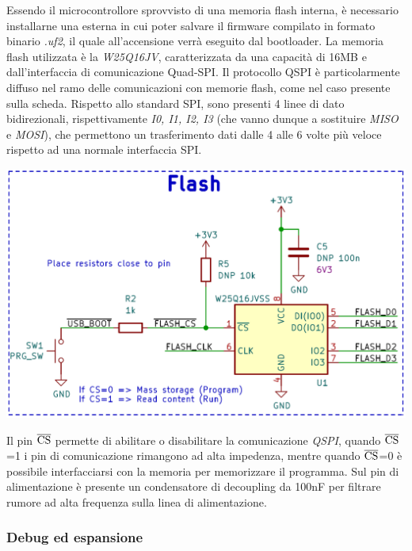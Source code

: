 Essendo il microcontrollore sprovvisto di una memoria flash interna, 
è necessario installarne una esterna in cui poter salvare il firmware compilato in formato
binario \emph{.uf2}, il quale all'accensione verrà eseguito dal bootloader. La
memoria flash utilizzata è la \emph{W25Q16JV}, caratterizzata da una capacità di 16MB e dall’interfaccia di comunicazione Quad-SPI.
Il protocollo QSPI è particolarmente diffuso nel ramo delle comunicazioni con memorie flash,
come nel caso presente sulla scheda. Rispetto allo standard SPI, sono
presenti 4 linee di dato bidirezionali, rispettivamente \emph{I0, I1,
I2, I3} (che vanno dunque a sostituire \emph{MISO} e \emph{MOSI}), che
permettono un trasferimento dati dalle 4 alle 6 volte più veloce
rispetto ad una normale interfaccia SPI.

\begin{center}
\includegraphics[scale=0.2]{figures/image49.png}
\captionsetup{type=figure}
\end{center}

\noindent Il pin $\overline{\rm {CS}}$ permette di abilitare o
disabilitare la comunicazione \emph{QSPI}, quando $\overline{\rm {CS}}$=1 i pin di
comunicazione rimangono ad alta impedenza, mentre quando $\overline{\rm {CS}}$=0 è
possibile interfacciarsi con la memoria per memorizzare il programma.
Sul pin di alimentazione è presente un condensatore di decoupling da 100nF per filtrare rumore ad alta
frequenza sulla linea di alimentazione.

\hypertarget{debug-ed-espansione}{%
\subsubsection{\texorpdfstring{\hfill\break
Debug ed espansione}{ Debug ed espansione}}\label{debug-ed-espansione}}

